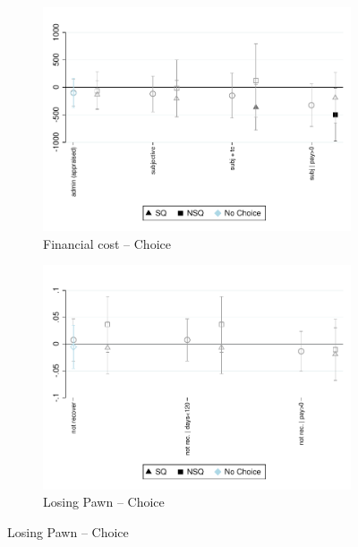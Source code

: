 \documentclass[oneside,11pt]{article}
\begin{document}
\begin{figure}[H]
    \caption{The effect of promises}
    \label{fc_pro5}
    \begin{center}
    

        \begin{subfigure}{0.45\textwidth}
        \caption{Financial cost -- Choice}
        \centering
        \includegraphics[width=\textwidth]{Figuras/fc_te_pro_5.pdf}
    \end{subfigure}
    \begin{subfigure}{0.45\textwidth}
        \caption{Losing Pawn -- Choice}
        \centering
        \includegraphics[width=\textwidth]{Figuras/def_te_pro_5.pdf}
    \end{subfigure}
    

\end{center}
\end{figure}
\end{document}
